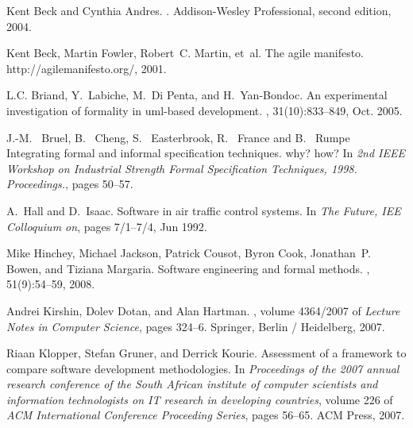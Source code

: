 \begin{thebibliography}{}

Kent Beck and Cynthia Andres.
.
\newblock Addison-Wesley Professional, second edition, 2004.

Kent Beck, Martin Fowler, Robert~C. Martin, et~al.
\newblock The agile manifesto.
\newblock http://agilemanifesto.org/, 2001.

L.C. Briand, Y.~Labiche, M.~{Di Penta}, and H.~Yan-Bondoc.
\newblock An experimental investigation of formality in uml-based development.
, 31(10):833--849,
  Oct. 2005.

J.-M.~ Bruel, B.~ Cheng, S.~ Easterbrook, R.~ France and B.~ Rumpe
\newblock Integrating formal and informal specification techniques. why? how?
\newblock In {\em 2nd IEEE Workshop on Industrial Strength Formal Specification Techniques, 1998. Proceedings.},
   pages 50--57.

A.~Hall and D.~Isaac.
\newblock Software in air traffic control systems.
\newblock In {\em The Future, IEE Colloquium on}, pages 7/1--7/4, Jun 1992.

Mike Hinchey, Michael Jackson, Patrick Cousot, Byron Cook, Jonathan~P. Bowen,
  and Tiziana Margaria.
\newblock Software engineering and formal methods.
, 51(9):54--59, 2008.

Andrei Kirshin, Dolev Dotan, and Alan Hartman.
,
  volume 4364/2007 of {\em Lecture Notes in Computer Science}, pages 324--6.
\newblock Springer, Berlin / Heidelberg, 2007.

Riaan Klopper, Stefan Gruner, and Derrick Kourie.
\newblock Assessment of a framework to compare software development
  methodologies.
\newblock In {\em Proceedings of the 2007 annual research conference of the
  South African institute of computer scientists and information technologists
  on IT research in developing countries}, volume 226 of {\em ACM International
  Conference Proceeding Series}, pages 56--65. ACM Press, 2007.


\end{thebibliography}
